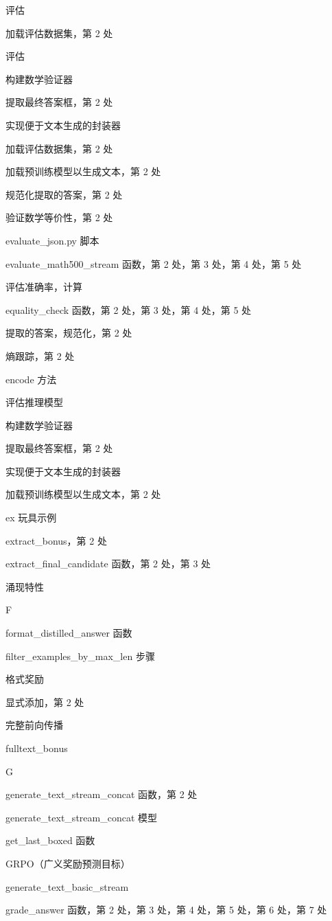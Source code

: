评估

加载评估数据集，第 2 处

评估

构建数学验证器

提取最终答案框，第 2 处

实现便于文本生成的封装器

加载评估数据集，第 2 处

加载预训练模型以生成文本，第 2 处

规范化提取的答案，第 2 处

验证数学等价性，第 2 处

evaluate\_json.py 脚本

evaluate\_math500\_stream 函数，第 2 处，第 3 处，第 4 处，第 5 处

评估准确率，计算

equality\_check 函数，第 2 处，第 3 处，第 4 处，第 5 处

提取的答案，规范化，第 2 处

熵跟踪，第 2 处

encode 方法

评估推理模型

构建数学验证器

提取最终答案框，第 2 处

实现便于文本生成的封装器

加载预训练模型以生成文本，第 2 处

ex 玩具示例

extract\_bonus，第 2 处

extract\_final\_candidate 函数，第 2 处，第 3 处

涌现特性

F

format\_distilled\_answer 函数

filter\_examples\_by\_max\_len 步骤

格式奖励

显式添加，第 2 处

完整前向传播

fulltext\_bonus

G

generate\_text\_stream\_concat 函数，第 2 处

generate\_text\_stream\_concat 模型

get\_last\_boxed 函数

GRPO（广义奖励预测目标）

generate\_text\_basic\_stream

grade\_answer 函数，第 2 处，第 3 处，第 4 处，第 5 处，第 6 处，第 7 处

